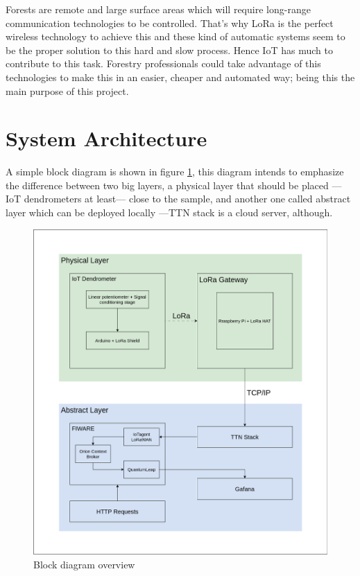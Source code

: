 \documentclass[11pt,a4paper,dvipsnames,twoside]{article}
\begin{document}
Forests are remote and large surface areas which will require long-range communication technologies to be controlled. That's why LoRa is the perfect wireless technology to achieve this and these kind of automatic systems seem to be the proper solution to this hard and slow process. Hence IoT has much to contribute to this task. Forestry professionals could take advantage of this technologies to make this in an easier, cheaper and automated way; being this the main purpose of this project.

\newpage\thispagestyle{plain}
\section{System Architecture}
A simple block diagram is shown in figure \ref{fig:block_diagram}, this diagram intends to emphasize the difference between two big layers, a physical layer that should be placed ---IoT dendrometers at least--- close to the sample, and another one called abstract layer which can be deployed locally ---TTN stack is a cloud server, although.

\begin{figure}[ht]
  \centering
  \includegraphics[width=.9\textwidth]{../schemes/simple_scheme_tbg.png}
  \caption{Block diagram overview}
  \label{fig:block_diagram}
\end{figure}
\end{document}
